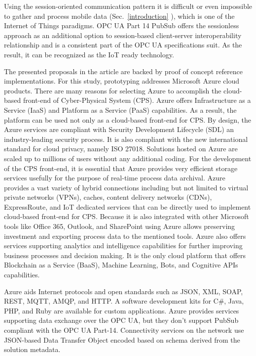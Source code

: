 \documentclass[runningheads]{llncs}
\begin{document}
Using the session-oriented communication pattern it is difficult or even impossible to gather and process mobile data (Sec.~\ref{introduction} ), which is one of the Internet of Things paradigms. OPC UA Part 14 PubSub \cite{RefWorks:doc:5d98837de4b055984c0eecf0, UAPart14PubSubMainTechnologyFeatures} offers the sessionless approach as an additional option to session-based client-server interoperability relationship and is a consistent part of the OPC UA specifications suit. As the result, it can be recognized as the IoT ready technology.

The presented proposals in the article are backed by proof of concept reference implementations\cite{mariusz_postol_2020_4361640}. For this study, prototyping addresses Microsoft Azure cloud products. There are many reasons for selecting Azure to accomplish the cloud-based front-end of Cyber-Physical System (CPS). Azure offers Infrastructure as a Service (IaaS) and Platform as a Service (PaaS) capabilities. As a result, the platform can be used not only as a cloud-based front-end for CPS. By design, the Azure services are compliant with Security Development Lifecycle (SDL) an industry-leading security process. It is also compliant with the new international standard for cloud privacy, namely ISO 27018. Solutions hosted on Azure are scaled up to millions of users without any additional coding. For the development of the CPS front-end, it is essential that Azure provides very efficient storage services usefully for the purpose of real-time process data archival. Azure provides a vast variety of hybrid connections including but not limited to virtual private networks (VPNs), caches, content delivery networks (CDNs), ExpressRoute, and IoT dedicated services that can be directly used to implement cloud-based front-end for CPS. Because it is also integrated with other Microsoft tools like Office 365, Outlook, and SharePoint using Azure allows preserving investment and exporting process data to the mentioned tools. Azure also offers services supporting analytics and intelligence capabilities for further improving business processes and decision making. It is the only cloud platform that offers Blockchain as a Service (BaaS), Machine Learning, Bots, and Cognitive APIs capabilities.

Azure aids Internet protocols and open standards such as JSON, XML, SOAP, REST, MQTT\cite{RefWorks:doc:5d91e158e4b02eb43d36bb97}, AMQP\cite{RefWorks:doc:5d91d2d9e4b0bc72a68ffe06}, and HTTP. A software development kits for C\#, Java, PHP, and Ruby are available for custom applications. Azure provides services supporting data exchange over the OPC UA, but they don't support PubSub compliant with the OPC UA Part-14. Connectivity services on the network use JSON-based Data Transfer Object encoded based on schema derived from the solution metadata.
\end{document}
